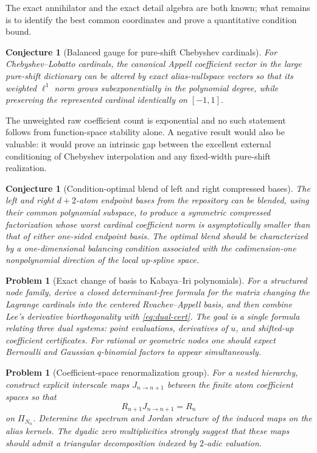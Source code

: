 \documentclass[11pt,oneside]{article}
\numberwithin{equation}{section}
\newtheorem{conjecture}[theorem]{Conjecture}
\newtheorem{problem}[theorem]{Problem}
\theoremstyle{definition}
\theoremstyle{remark}
\begin{document}
The exact annihilator and the exact detail algebra are both known; what remains is
to identify the best common coordinates and prove a quantitative condition bound.

\begin{conjecture}[Balanced gauge for pure-shift Chebyshev cardinals]
\label{conj:balanced}
For Chebyshev--Lobatto cardinals, the canonical Appell coefficient vector in the
large pure-shift dictionary can be altered by exact alias-nullspace vectors so that
its weighted \(\ell^1\) norm grows subexponentially in the polynomial degree, while
preserving the represented cardinal identically on \([-1,1]\).
\end{conjecture}

The unweighted raw coefficient count is exponential and no such statement follows
from function-space stability alone.  A negative result would also be valuable: it
would prove an intrinsic gap between the excellent external conditioning of
Chebyshev interpolation and any fixed-width pure-shift realization.

\begin{conjecture}[Condition-optimal blend of left and right compressed bases]
\label{conj:blend}
The left and right \(d+2\)-atom endpoint bases from the repository can be blended,
using their common polynomial subspace, to produce a symmetric compressed
factorization whose worst cardinal coefficient norm is asymptotically smaller than
that of either one-sided endpoint basis.  The optimal blend should be characterized
by a one-dimensional balancing condition associated with the codimension-one
nonpolynomial direction of the local up-spline space.
\end{conjecture}

\begin{problem}[Exact change of basis to Kabaya--Iri polynomials]
\label{prob:KI-change}
For a structured node family, derive a closed determinant-free formula for the
matrix changing the Lagrange cardinals into the centered Rvachev--Appell basis,
and then combine Lee's derivative biorthogonality with
\eqref{eq:dual-cert}.  The goal is a single formula relating three dual systems:
point evaluations, derivatives of \(u\), and shifted-up coefficient certificates.
For rational or geometric nodes one should expect Bernoulli and Gaussian
\(q\)-binomial factors to appear simultaneously.
\end{problem}

\begin{problem}[Coefficient-space renormalization group]
\label{prob:rg}
For a nested hierarchy, construct explicit interscale maps
\(J_{n\to n+1}\) between the finite atom coefficient spaces so that
\[
 R_{n+1}J_{n\to n+1}=R_n
\]
on \(\Pi_{N_n}\).  Determine the spectrum and Jordan structure of the induced
maps on the alias kernels.  The dyadic zero multiplicities strongly suggest that
these maps should admit a triangular decomposition indexed by \(2\)-adic
valuation.
\end{problem}
\end{document}
